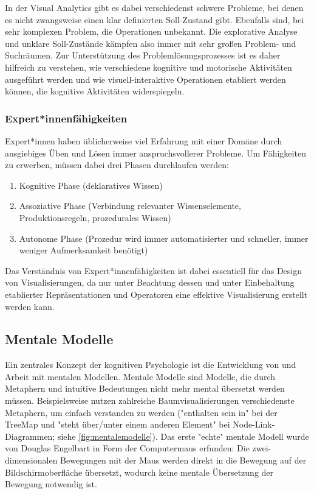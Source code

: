 				In der Visual Analytics gibt es dabei verschiedenst schwere Probleme, bei denen es nicht zwangsweise einen klar definierten Soll-Zustand gibt. Ebenfalls sind, bei sehr komplexen Problem, die Operationen unbekannt. Die explorative Analyse und unklare Soll-Zustände kämpfen also immer mit sehr großen Problem- und Suchräumen. Zur Unterstützung des Problemlösungsprozesses ist es daher hilfreich zu verstehen, wie verschiedene kognitive und motorische Aktivitäten ausgeführt werden und wie visuell-interaktive Operationen etabliert werden können, die kognitive Aktivitäten widerspiegeln.

			\subsubsection{Expert*innenfähigkeiten}
				Expert*innen haben üblicherweise viel Erfahrung mit einer Domäne durch ausgiebiges Üben und Lösen immer anspruchsvollerer Probleme. Um Fähigkeiten zu erwerben, müssen dabei drei Phasen durchlaufen werden:
				\begin{enumerate}
					\item Kognitive Phase (deklaratives Wissen)
					\item Assoziative Phase (Verbindung relevanter Wissenselemente, Produktionsregeln, prozedurales Wissen)
					\item Autonome Phase (Prozedur wird immer automatisierter und schneller, immer weniger Aufmerksamkeit benötigt)
				\end{enumerate}
				Das Verständnis von Expert*innenfähigkeiten ist dabei essentiell für das Design von Visualisierungen, da nur unter Beachtung dessen und unter Einbehaltung etablierter Repräsentationen und Operatoren eine effektive Visualisierung erstellt werden kann.

		\subsection{Mentale Modelle}
			Ein zentrales Konzept der kognitiven Psychologie ist die Entwicklung von und Arbeit mit mentalen Modellen. Mentale Modelle sind Modelle, die durch Metaphern und intuitive Bedeutungen nicht mehr mental übersetzt werden müssen. Beispielsweise nutzen zahlreiche Baumvisualisierungen verschiedenste Metaphern, um einfach verstanden zu werden (\bspw "enthalten sein in" bei der TreeMap und "steht über/unter einem anderen Element" bei Node-Link-Diagrammen; siehe \autoref{fig:mentalemodelle}). Das erste "echte" mentale Modell wurde von Douglas Engelbart in Form der Computermaus erfunden: Die zwei-dimensionalen Bewegungen mit der Maus werden direkt in die Bewegung auf der Bildschirmoberfläche übersetzt, wodurch keine mentale Übersetzung der Bewegung notwendig ist.

